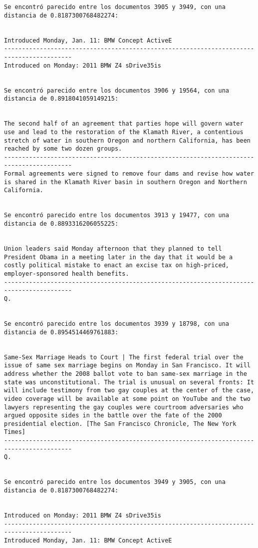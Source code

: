 \documentclass[11pt]{article}
\begin{document}
\begin{Verbatim}[commandchars=\\\{\}]
Se encontró parecido entre los documentos 3905 y 3949, con una distancia de 0.8187300768482274:


Introduced Monday, Jan. 11: BMW Concept ActiveE
-----------------------------------------------------------------------------------------
Introduced on Monday: 2011 BMW Z4 sDrive35is


Se encontró parecido entre los documentos 3906 y 19564, con una distancia de 0.8918041059149215:


The second half of an agreement that parties hope will govern water use and lead to the restoration of the Klamath River, a contentious stretch of water in southern Oregon and northern California, has been reached by some two dozen groups.
-----------------------------------------------------------------------------------------
Formal agreements were signed to remove four dams and revise how water is shared in the Klamath River basin in southern Oregon and Northern California.


Se encontró parecido entre los documentos 3913 y 19477, con una distancia de 0.8893316206055225:


Union leaders said Monday afternoon that they planned to tell President Obama in a meeting later in the day that it would be a costly political mistake to enact an excise tax on high-priced, employer-sponsored health benefits.
-----------------------------------------------------------------------------------------
Q.


Se encontró parecido entre los documentos 3939 y 18798, con una distancia de 0.8954514469761883:


Same-Sex Marriage Heads to Court | The first federal trial over the issue of same sex marriage begins on Monday in San Francisco. It will address whether the 2008 ballot vote to ban same-sex marriage in the state was unconstitutional. The trial is unusual on several fronts: It will include testimony from two gay couples at the center of the case, video coverage will be available at some point on YouTube and the two lawyers representing the gay couples were courtroom adversaries who argued opposite sides in the battle over the fate of the 2000 presidential election. [The San Francisco Chronicle, The New York Times]
-----------------------------------------------------------------------------------------
Q.


Se encontró parecido entre los documentos 3949 y 3905, con una distancia de 0.8187300768482274:


Introduced on Monday: 2011 BMW Z4 sDrive35is
-----------------------------------------------------------------------------------------
Introduced Monday, Jan. 11: BMW Concept ActiveE



\end{Verbatim}
\end{document}
